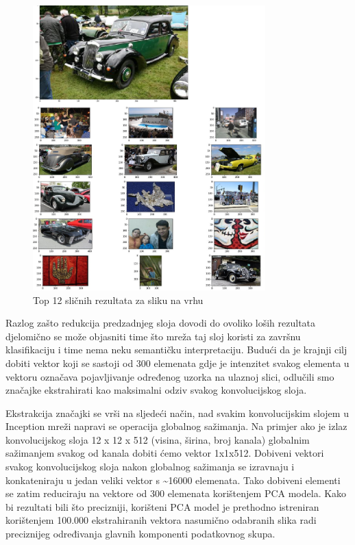 \documentclass[times, utf8, proizvoljni, numeric]{fer}
\begin{document}
\begin{figure}[H]
	\begin{center}
		\captionsetup{justification=centering}
		\includegraphics[width=0.8\textwidth]{./imgs/inception_zadnji_sloj_auti_greska.png}
		\caption{Top 12 sličnih rezultata za sliku na vrhu}
		\label{fg:inception_zadnji_sloj_auti_greska}
	\end{center}
\end{figure}

Razlog zašto redukcija predzadnjeg sloja dovodi do ovoliko loših rezultata djelomično se može objasniti time što mreža taj sloj koristi za završnu klasifikaciju i time nema neku semantičku interpretaciju. Budući da je krajnji cilj dobiti vektor koji se sastoji od 300 elemenata gdje je intenzitet svakog elementa u vektoru označava pojavljivanje određenog uzorka na ulaznoj slici, odlučili smo značajke ekstrahirati kao maksimalni odziv svakog konvolucijskog sloja. 

Ekstrakcija značajki se vrši na sljedeći način, nad svakim konvolucijskim slojem u Inception mreži napravi se operacija globalnog sažimanja. Na primjer ako je izlaz konvolucijskog sloja 12 x 12 x 512 (visina, širina, broj kanala) globalnim sažimanjem svakog od kanala dobiti ćemo vektor 1x1x512. Dobiveni vektori svakog konvolucijskog sloja nakon globalnog sažimanja se izravnaju i konkateniraju u jedan veliki vektor s  \textasciitilde16000 elemenata.  Tako dobiveni elementi se zatim reduciraju na vektore od 300 elemenata korištenjem PCA modela. Kako bi rezultati bili što precizniji, korišteni PCA model je prethodno istreniran korištenjem 100.000 ekstrahiranih vektora nasumično odabranih slika radi preciznijeg određivanja glavnih komponenti podatkovnog skupa.
\end{document}
